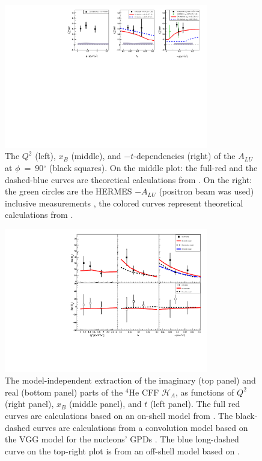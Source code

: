 \documentclass[preprint,nofootinbib,showpacs,prl,superscriptaddress,secnumarabic,amssymb,nobibnotes,aps,floatfix]{revtex4}
\begin{document}
\begin{figure}[tb]
\includegraphics[width=8.9cm]{figs/coherent-ALU_90.pdf}
\caption{The $Q^{2}$ (left), $x_{B}$ (middle), and $-t$-dependencies (right) of
   the $A_{LU}$ at $\phi$~=~90$^{\circ}$ (black squares). On the 
   middle plot: the full-red and the dashed-blue curves are theoretical 
   calculations from \cite{simonetta_2}. On the right: the green circles are 
   the HERMES $-A_{LU}$ (positron beam was used) inclusive measurements 
   \cite{HERMES_BSA}, the colored curves represent theoretical calculations 
   from \cite{simonetta_2}.}
\label{fig:alu90}
\end{figure}


\begin{figure}[tb]
\includegraphics[width=8.9cm]{figs/Coherent_CFF.pdf}
\caption{The model-independent extraction of the imaginary (top panel) and
real (bottom panel) parts of the $^4$He CFF $\mathcal{H}_A$, as functions of
$Q^{2}$ (right panel), $x_B$ (middle panel), and $t$ (left panel). The full red 
curves are calculations based on an on-shell model from
\cite{Vadim_priv}. The black-dashed curves are calculations from a convolution 
model based on the VGG model for the nucleons' GPDs \cite{Guidal_priv}. The 
blue long-dashed curve on the top-right plot is from
an off-shell model based on \cite{GonzalezHernandez:2012jv}.}
\label{fig:CFF_HA}
\end{figure}
\end{document}
